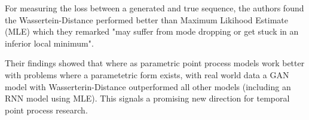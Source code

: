 For measuring the loss between a generated and true sequence, the authors found the Wassertein-Distance \parencite{WassGAN} performed better than Maximum Likihood Estimate (MLE) which they remarked "may suffer from mode dropping or get stuck in an inferior local minimum".

Their findings showed that where as parametric point process models work better with problems where a parametetric form exists, with real world data a GAN model with Wasserterin-Distance outperformed all other models (including an RNN model using MLE). This signals a promising new direction for temporal point process research.

